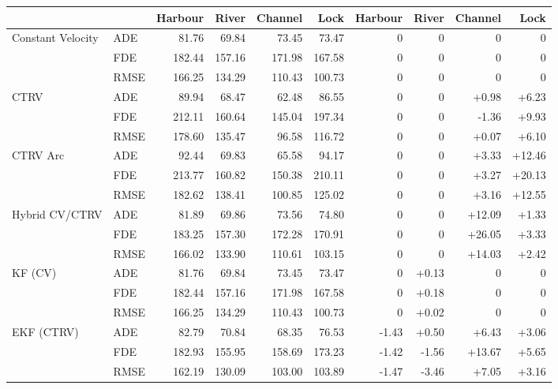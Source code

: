 \begin{table}[h]
\begin{tabular}{llrrrrrrrr}
            & & 
            \textbf{Harbour} & \textbf{River} & \textbf{Channel} & \textbf{Lock} &
            \textbf{Harbour} & \textbf{River} & \textbf{Channel} & \textbf{Lock} \\
            \midrule
            Constant Velocity   
            & ADE  & 81.76 & 69.84 & 73.45 & 73.47 & 0 & 0 & 0 & 0 \\
            & FDE  & 182.44 & 157.16 & 171.98 & 167.58 & 0 & 0 & 0 & 0 \\
            & RMSE & 166.25 & 134.29 & 110.43 & 100.73 & 0 & 0 & 0 & 0 \\
            \midrule
            CTRV                
            & ADE  & 89.94 & 68.47 & 62.48 & 86.55 & 0 & 0 & +0.98 & +6.23 \\
            & FDE  & 212.11 & 160.64 & 145.04 & 197.34 & 0 & 0 & -1.36 & +9.93 \\
            & RMSE & 178.60 & 135.47 & 96.58 & 116.72 & 0 & 0 & +0.07 & +6.10 \\
            \midrule
            CTRV Arc            
            & ADE  & 92.44 & 69.83 & 65.58 & 94.17 & 0 & 0 & +3.33 & +12.46 \\
            & FDE  & 213.77 & 160.82 & 150.38 & 210.11 & 0 & 0 & +3.27 & +20.13 \\
            & RMSE & 182.62 & 138.41 & 100.85 & 125.02 & 0 & 0 & +3.16 & +12.55 \\
            \midrule
            Hybrid CV/CTRV      
            & ADE  & 81.89 & 69.86 & 73.56 & 74.80 & 0 & 0 & +12.09 & +1.33 \\
            & FDE  & 183.25 & 157.30 & 172.28 & 170.91 & 0 & 0 & +26.05 & +3.33 \\
            & RMSE & 166.02 & 133.90 & 110.61 & 103.15 & 0 & 0 & +14.03 & +2.42 \\
            \midrule
            KF (CV)             
            & ADE  & 81.76 & 69.84 & 73.45 & 73.47 & 0 & +0.13 & 0 & 0 \\
            & FDE  & 182.44 & 157.16 & 171.98 & 167.58 & 0 & +0.18 & 0 & 0 \\
            & RMSE & 166.25 & 134.29 & 110.43 & 100.73 & 0 & +0.02 & 0 & 0 \\
            \midrule
            EKF (CTRV)          
            & ADE  & 82.79 & 70.84 & 68.35 & 76.53 & -1.43 & +0.50 & +6.43 & +3.06 \\
            & FDE  & 182.93 & 155.95 & 158.69 & 173.23 & -1.42 & -1.56 & +13.67 & +5.65 \\
            & RMSE & 162.19 & 130.09 & 103.00 & 103.89 & -1.47 & -3.46 & +7.05 & +3.16 \\

\end{tabular}
\end{table}
